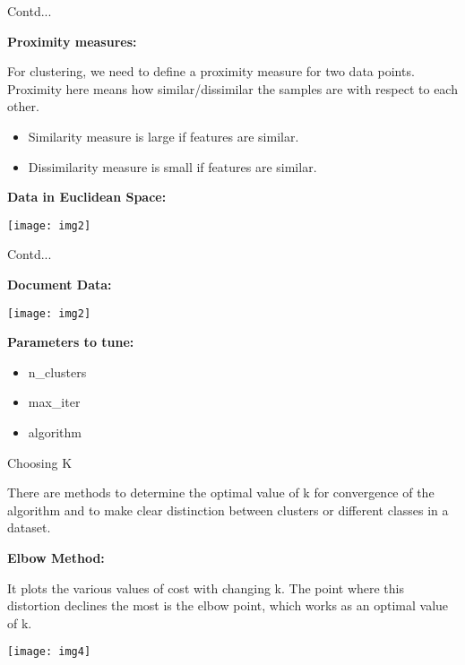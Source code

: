 \documentclass{beamer}
\newcommand\myheading[1]{%
  \par\bigskip
  {\large\bfseries#1}\par\smallskip}
\begin{document}
\begin{frame}{Contd...}
	\begin{flushleft}
		\myheading{Proximity measures:}
		For clustering, we need to define a proximity measure for two data points. Proximity here means how similar/dissimilar the samples are with respect to each other.
		\begin{itemize}
			\item Similarity measure is large if features are similar.
			\item Dissimilarity measure is small if features are similar.
		\end{itemize}
		\myheading{Data in Euclidean Space:}
	\end{flushleft}
		\texttt{[image: img2]}	
\end{frame}

\begin{frame}{Contd...}
\begin{flushleft}
	\myheading{Document Data:}
\end{flushleft}
	\texttt{[image: img2]}	
	\begin{flushleft}
		\myheading{Parameters to tune:}
		\begin{itemize}
			\item n\_clusters
			\item max\_iter
			\item algorithm
		\end{itemize}
	\end{flushleft}
\end{frame}

\begin{frame}{Choosing K}
	\begin{flushleft}
		There are methods to determine the optimal value of k for convergence of the algorithm and to make clear distinction between clusters or different classes in a dataset.
	\myheading{Elbow Method:}
	It plots the various values of cost with changing k. The point where this distortion declines the most is the elbow point, which works as an optimal value of k.
	\end{flushleft}
	\texttt{[image: img4]}
\end{frame}
\end{document}
